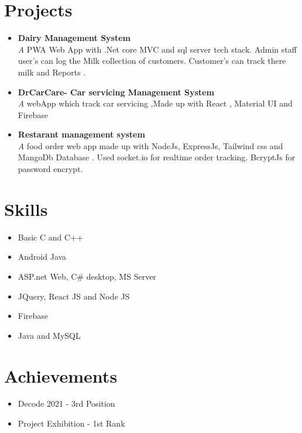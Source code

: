 \documentclass[letterpaper,11pt]{article}
\begin{document}
\section*{Projects}
\begin{itemize}[leftmargin=*]
    \item \textbf{Dairy Management System} \\
    \emph A PWA Web App with .Net core MVC and sql server tech stack. Admin staff user's can log the Milk collection of customers. Customer's can track there milk and Reports .
    \item \textbf{DrCarCare- Car servicing Management System} \\
    \emph A webApp which track car servicing ,Made up with React , Material UI and Firebase 
    
    \item \textbf{Restarant management system} \\
    \emph A food order web app made up with NodeJs, ExpressJs, Tailwind css and MangoDb Database . Used socket.io for realtime order tracking. BcryptJs for password encrypt.
\end{itemize}

\section*{Skills}
\begin{multicols}{2}
\begin{itemize}[leftmargin=*]
    \item Basic C and C++
    \item Android Java
    \item ASP.net Web, C\# desktop, MS Server
    \item JQuery, React JS and Node JS
    \item Firebase
    \item Java and MySQL
\end{itemize}
\end{multicols}

\section*{Achievements}
\begin{multicols}{2}
\begin{itemize}[leftmargin=*]
    \item Decode 2021 - 3rd Position
    \item Project Exhibition - 1st Rank
\end{itemize}
\end{multicols}
\end{document}
